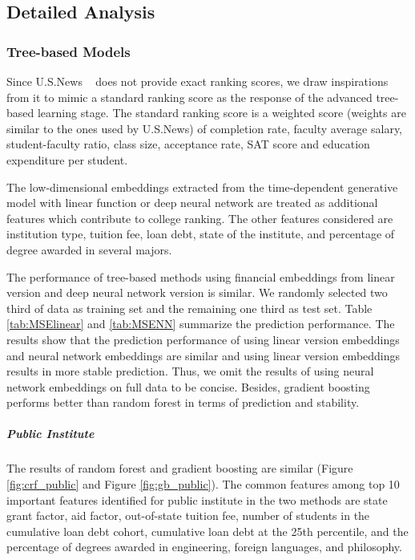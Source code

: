 \documentclass[11pt,letter]{article}
\begin{document}
\subsection{Detailed Analysis}
\subsubsection{Tree-based Models}
Since U.S.News ~\cite{usnews} does not provide exact ranking scores, we draw inspirations from it to mimic a standard ranking score as the response of the advanced tree-based learning stage. The standard ranking score is a weighted score (weights are similar to the ones used by U.S.News) of completion rate, faculty average salary, student-faculty ratio, class size, acceptance rate, SAT score and education expenditure per student. 

The low-dimensional embeddings extracted from the time-dependent generative model with linear function or deep neural network are treated as additional features which contribute to college ranking. The other features considered are institution type, tuition fee, loan debt, state of the institute, and percentage of degree awarded in several majors.

The performance of tree-based methods using financial embeddings from linear version and deep neural network version is similar. We randomly selected two third of data as training set and the remaining one third as test set. Table \ref{tab:MSElinear} and \ref{tab:MSENN} summarize the prediction performance. The results show that the prediction performance of using linear version embeddings and neural network embeddings are similar and using linear version embeddings results in more stable prediction. Thus, we omit the results of using neural network embeddings on full data to be concise. Besides, gradient boosting performs better than random forest in terms of prediction and stability.


\subparagraph*{Public Institute}
The results of random forest and gradient boosting are similar (Figure \ref{fig:crf_public} and Figure \ref{fig:gb_public}).
The common features among top 10 important features identified for public institute in the two methods are state grant factor, aid factor, out-of-state tuition fee, number of students in the cumulative loan debt cohort, cumulative loan debt at the 25th percentile, and the percentage of degrees awarded in engineering, foreign languages, and philosophy.
\end{document}
